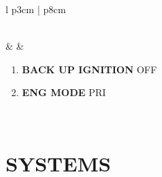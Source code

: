 \documentclass[8pt,usenames,dvipsnames,twoside]{article}
\begin{document}
\begin{center}
\begin{longtable}{l p{3cm} | p{8cm}}
\begin{minipage}[t]{\linewidth}
			\end{minipage} \\
			\midrule
			\textbullet &  &
			\begin{minipage}[t]{\linewidth}
				\vspace{-7pt}
				\begin{enumerate}
					\item \textbf{BACK UP IGNITION} \dotfill OFF
					\item \textbf{ENG MODE} \dotfill PRI
				\end{enumerate}
			\end{minipage} \\
			\bottomrule
		\end{longtable}
	\end{center}

	\cleardoublepage

	\section{SYSTEMS}
\end{document}
